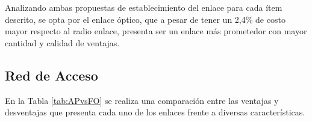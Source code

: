 Analizando ambas propuestas de establecimiento del enlace para cada ítem descrito, se opta por el enlace óptico, que a pesar de tener un 2,4\% de costo mayor respecto al radio enlace, presenta ser un enlace más prometedor con mayor cantidad  y calidad de ventajas.

 
 
 
 
 
 
 
 
 
 
 
 
 \subsection{Red de Acceso}
 

En la Tabla \ref{tab:APvsFO} se realiza una comparación entre las ventajas y desventajas que presenta cada uno de los enlaces frente a diversas características.

